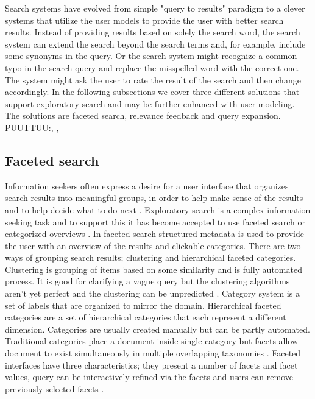 \documentclass{sigchi}
\begin{document}
Search systems have evolved from simple "query to results" paradigm to a clever systems that utilize the user models to provide the user with better search results. Instead of providing results based on solely the search word, the search system can extend the search beyond the search terms and, for example, include some synonyms in the query. Or the search system might recognize a common typo in the search query and replace the misspelled word with the correct one. The system might ask the user to rate the result of the search and then change accordingly. In the following subsections we cover three different solutions that support exploratory search and may be further enhanced with user modeling. The solutions are faceted search, relevance feedback and query expansion.
PUUTTUU:\cite{bunt04}, \cite{findlater04}, \cite{brusi96}

\subsection{Faceted search}

Information seekers often express a desire for a user interface that organizes search results into meaningful groups, in order to help make sense of the results and to help decide what to do next \cite{hearst06}. Exploratory search is a complex information seeking task and to support this it has become accepted to use faceted search or categorized overviews \cite{kules09}. In faceted search structured metadata is used to provide the user with an overview of the results and clickable categories. There are two ways of grouping search results; clustering and hierarchical faceted categories. Clustering is grouping of items based on some similarity and is fully automated process. It is good for clarifying a vague query but the clustering algorithms aren't yet perfect and the clustering can be unpredicted \cite{hearst06}. Category system is a set of labels that are organized to mirror the domain. Hierarchical faceted categories are a set of hierarchical categories that each represent a different dimension. Categories are usually created manually but can be partly automated. Traditional categories place a document inside single category but facets allow document to exist simultaneously in multiple overlapping taxonomies \cite{koren08}. Faceted interfaces have three characteristics; they present a number of facets and facet values, query can be interactively refined via the facets and users can remove previously selected facets \cite{koren08}. 
\end{document}
